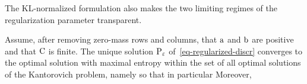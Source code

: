 The KL-normalized formulation also makes the two limiting regimes of the regularization parameter transparent.

\begin{prop}\label{prop-convergence-eps}
	Assume, after removing zero-mass rows and columns, that $\a$ and $\b$ are positive and that $\C$ is finite.
	The unique solution $\P_\epsilon$ of~\eqref{eq-regularized-discr} converges to the optimal solution with maximal entropy within the set of all optimal solutions of the Kantorovich problem, namely
so that in particular
Moreover,
\end{prop}

